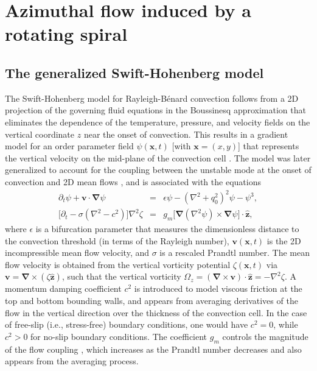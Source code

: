 \documentclass[preprint,prx,floatfix]{revtex4-1}
\begin{document}
\section{Azimuthal flow induced by a rotating spiral}

\subsection{The generalized Swift-Hohenberg model}
\label{sec:gsh}

The Swift-Hohenberg model for Rayleigh-B\'enard convection \cite{swift1977hydrodynamic} follows from a 2D projection of the governing fluid equations in the Boussinesq approximation that eliminates the dependence of the temperature, pressure, and velocity fields on the vertical coordinate $z$ near the onset of convection. This results in a gradient model for an order parameter field $\psi(\mathbf{x},t)$ [with $\mathbf{x} = (x,y)$] that represents the vertical velocity on the mid-plane of the convection cell \cite{manneville1983two,manneville1984modelisation,manneville1990dissipative}. The model was later generalized to account for the coupling between the unstable mode at the onset of convection and 2D mean flows \cite{manneville1983two,re:greenside85}, and is associated with the equations
\begin{eqnarray}
  \label{eq:sh}
  \partial_t\psi + \mathbf{v}\cdot{\bm \nabla}\psi &=& \epsilon\psi -(\nabla^2+q_0^2)^2\psi - \psi^{3},
  \\
  \label{eq:vort}
  \Big[\partial_t - \sigma(\nabla^2-c^2) \Big]\nabla^2\zeta &=& g_m \Big[{\bm \nabla} (\nabla^2\psi)\times{\bm \nabla}\psi\Big]\cdot\mathbf{\hat{z}},
\end{eqnarray}
where $\epsilon$ is a bifurcation parameter that measures the dimensionless distance to the convection threshold (in terms of the Rayleigh number), $\mathbf{v}(\mathbf{x},t)$ is the 2D incompressible mean flow velocity, and $\sigma$ is a rescaled Prandtl number. The mean flow velocity is obtained from the vertical vorticity potential $\zeta(\mathbf{x},t)$ via $\mathbf{v} = \bm{\nabla}\times(\zeta \mathbf{\hat{z}})$, such that the vertical vorticity $\Omega_z = ({\bm \nabla} \times \mathbf{v}) \cdot \hat{\mathbf z} = -\nabla^2 \zeta$. A momentum damping coefficient $c^{2}$ is introduced to model viscous friction at the top and bottom bounding walls, and appears from averaging derivatives of the flow in the vertical direction over the thickness of the convection cell.  In the case of free-slip (i.e., stress-free) boundary conditions, one would have $c^2=0$, while $c^2 > 0$ for no-slip boundary conditions. The coefficient $g_{m}$ controls the magnitude of the flow coupling \cite{re:greenside85,manneville1984modelisation}, which increases as the Prandtl number decreases and also appears from the averaging process.
\end{document}
